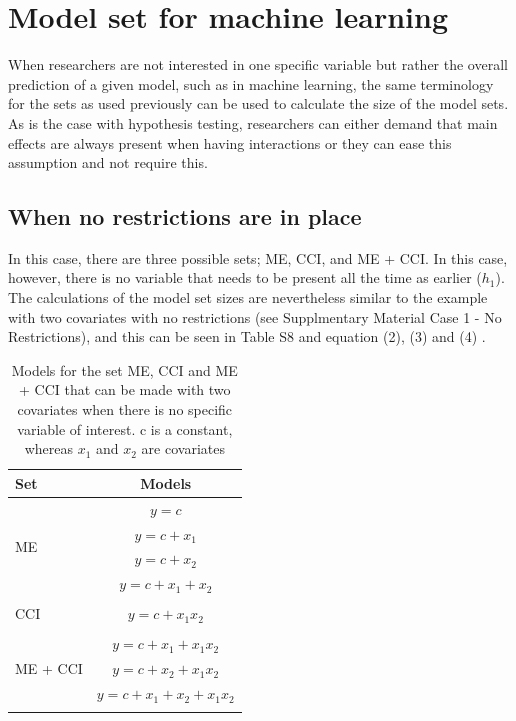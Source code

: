 




\section{Model set for machine learning}
When researchers are not interested in one specific variable but rather the overall prediction of a given model, such as in machine learning, the same terminology for the sets as used previously can be used to calculate the size of the model sets. 
As is the case with hypothesis testing, researchers can either demand that main effects are always present when having interactions or they can ease this assumption and not require this. \\

\subsection{When no restrictions are in place}
In this case, there are three possible sets; ME, CCI, and ME + CCI. In this case, however, there is no variable that needs to be present all the time as earlier ($h_1$). The calculations of the model set sizes are nevertheless similar to the example with two covariates with no restrictions (see Supplmentary Material Case 1 - No Restrictions), and this can be seen in Table S8 and equation (2), (3) and (4) .  

\begin{table}
\caption{Models for the set ME, CCI and ME + CCI that can be made with two covariates when there is no specific variable of interest. c is a constant, whereas $x_1$ and $x_2$ are covariates}
\centering
\begin{tabular}{lc} 
\toprule
Set & Models \\ 
\midrule
\multirow{4}{*}{ME} & $y=c$\\ & $y=c + x_1$\\ & $y=c + x_2$\\ & $y=c + x_1 + x_2$\\ &  \\  
\multirow{1}{*}{CCI} & $y=c + x_1x_2$\\  & \\ 
\multirow{3}{*}{ME + CCI}  & $y=c + x_1 + x_1x_2$\\ & $y=c + x_2 + x_1x_2$\\ & $y=c + x_1 + x_2 + x_1x_2$\\ &  \\  
\bottomrule
\end{tabular}
\end{table}

